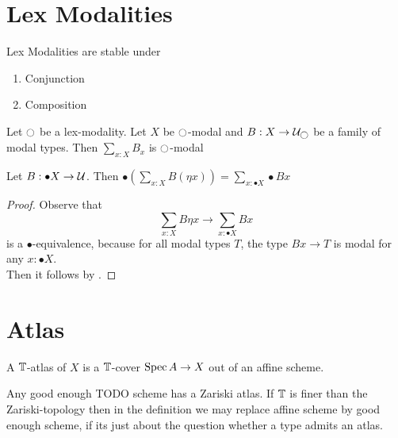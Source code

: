 \documentclass{article}
\begin{document}
\section{Lex Modalities}
\begin{lemma}{\label{lemma:LexStability}}
Lex Modalities are stable under 
\begin{enumerate}
    \item Conjunction
    \item Composition
\end{enumerate}
    
\end{lemma}
\begin{lemma}{\label{lemma:LexSumStable}}
    Let $\ci$ be a lex-modality. Let $X$ be $\ci$-modal and $B : X \to \cU_{\ci}$ be a family of modal types. Then $\sum_{x : X} B_x$ is $\ci$-modal
\end{lemma}
\begin{lemma}{\label{lemma:mod_comm_sum}}
    Let $B  : \bullet X \to \mathcal{U}$. Then $\bullet (\sum_{x : X} B (\eta x)) = \sum_{x : \bullet X} \bullet B x$
\end{lemma}
\begin{proof}
    Observe that 
    \[
    \sum_{x : X} B \eta x \to \sum_{x : \bullet X} B x
    \]
    is a $\bullet$-equivalence, because for all modal types $T$, the type $B x \to T$ is modal for any $x : \bullet X$. \\
    Then it follows by \todocite.
\end{proof}
\section{Atlas}
\begin{definition}{\label{def:TAtlas}}
    A $\mathbb{T}$-atlas of $X$ is a $\mathbb{T}$-cover $\operatorname{Spec} A \to X$ out of an affine scheme.
\end{definition}
\begin{rmk}{\label{rmk:defatlas}}
    Any good enough TODO scheme has a Zariski atlas. If $\mathbb{T}$ is finer than the Zariski-topology then in the definition we may replace affine scheme by good enough scheme, if its just about the question whether a type admits an atlas.
\end{rmk}
\end{document}
